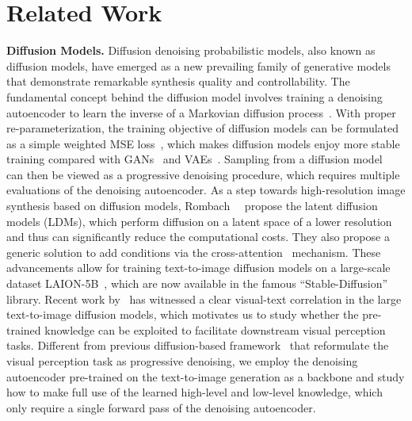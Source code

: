 \documentclass[10pt,twocolumn,letterpaper]{article}
\newcommand{\paragrapha}[2][4pt]{\vspace{#1}\noindent\textbf{#2}}
\begin{document}
\section{Related Work}
\paragrapha{Diffusion Models.} Diffusion denoising probabilistic models, also known as diffusion models, have emerged as a new prevailing family of generative models that demonstrate remarkable synthesis quality and controllability. The fundamental concept behind the diffusion model involves training a denoising autoencoder to learn the inverse of a Markovian diffusion process~\cite{sohl2015deep,ho2020ddpm}. With proper re-parameterization, the training objective of diffusion models can be formulated as a simple weighted MSE loss~\cite{ho2020ddpm}, which makes diffusion models enjoy more stable training compared with GANs~\cite{goodfellow2014generative} and VAEs~\cite{kingma2013auto}. Sampling from a diffusion model~\cite{song2020denoising,liu2022pseudo,lu2022dpmsolver} can then be viewed as a progressive denoising procedure, which requires multiple evaluations of the denoising autoencoder. 
As a step towards high-resolution image synthesis based on diffusion models, Rombach~\etal~\cite{rombach2022high} propose the latent diffusion models (LDMs), which perform diffusion on a latent space of a lower resolution and thus can significantly reduce the computational costs. They also propose a generic solution to add conditions via the cross-attention~\cite{vaswani2017attention} mechanism. These advancements allow for training text-to-image diffusion models on a large-scale dataset LAION-5B~\cite{schuhmann2022laion}, which are now available in the famous ``Stable-Diffusion'' library. Recent work by~\cite{hertz2022prompt} has witnessed a clear visual-text correlation in the large text-to-image diffusion models, which motivates us to study whether the pre-trained knowledge can be exploited to facilitate downstream visual perception tasks. Different from previous diffusion-based framework~\cite{chen2022diffusiondet,amit2021segdiff} that reformulate the visual perception task as progressive denoising, we employ the denoising autoencoder pre-trained on the text-to-image generation as a backbone and study how to make full use of the learned high-level and low-level knowledge, which only require a single forward pass of the denoising autoencoder.
\end{document}
